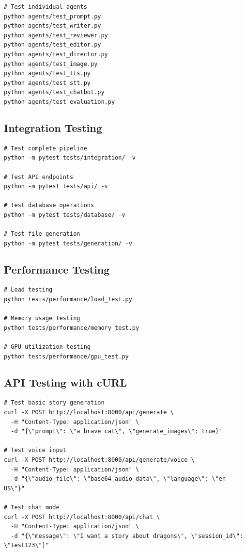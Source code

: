 {\begin{verbatim}
# Test individual agents
python agents/test_prompt.py
python agents/test_writer.py
python agents/test_reviewer.py
python agents/test_editor.py
python agents/test_director.py
python agents/test_image.py
python agents/test_tts.py
python agents/test_stt.py
python agents/test_chatbot.py
python agents/test_evaluation.py
\end{verbatim}

\subsection{Integration Testing}
\begin{verbatim}
# Test complete pipeline
python -m pytest tests/integration/ -v

# Test API endpoints
python -m pytest tests/api/ -v

# Test database operations
python -m pytest tests/database/ -v

# Test file generation
python -m pytest tests/generation/ -v
\end{verbatim}

\subsection{Performance Testing}
\begin{verbatim}
# Load testing
python tests/performance/load_test.py

# Memory usage testing
python tests/performance/memory_test.py

# GPU utilization testing
python tests/performance/gpu_test.py
\end{verbatim}

\subsection{API Testing with cURL}
\begin{verbatim}
# Test basic story generation
curl -X POST http://localhost:8000/api/generate \
  -H "Content-Type: application/json" \
  -d "{\"prompt\": \"a brave cat\", \"generate_images\": true}"

# Test voice input
curl -X POST http://localhost:8000/api/generate/voice \
  -H "Content-Type: application/json" \
  -d "{\"audio_file\": \"base64_audio_data\", \"language\": \"en-US\"}"

# Test chat mode
curl -X POST http://localhost:8000/api/chat \
  -H "Content-Type: application/json" \
  -d "{\"message\": \"I want a story about dragons\", \"session_id\": \"test123\"}"


\end{verbatim}}
